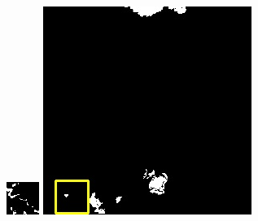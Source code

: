 \documentclass[10pt,UTF8,fntef]{ctexart}
\begin{document}
\begin{multicols}{2}
\begin{figure}[H]
{\begin{minipage}[b]{0.15\linewidth}
            \includegraphics[width=1\linewidth]{../log/spoon4/cut/tmp_cut_LC80980712014024LGN00_15440_mask.jpg}\vspace{4pt}
            \includegraphics[width=1\linewidth]{../log/spoon4/cut/LC81390292014135LGN00_14081_mask.jpg}\vspace{4pt}

\end{minipage}}
\end{figure}
\end{multicols}
\end{document}
